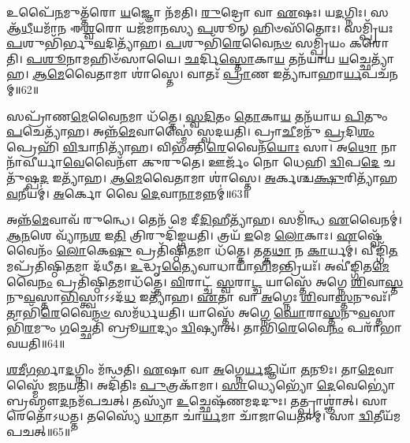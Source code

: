 𑌉𑌪𑍈᳴\-\ul{𑌨}\-𑌮𑍁𑌤𑍍𑌤᳴𑌰𑍋 \ul{𑌯}\-𑌜𑍍𑌞𑍋 𑌨᳴𑌮𑌤𑌿।
\-\ul{𑌰𑍁}\-𑌦𑍍𑌰𑍋 𑌵𑌾 \ul{𑌏}\-𑌷𑌃।
𑌯\-\ul{𑌦}\-𑌗𑍍𑌨𑌿𑌃।
𑌸 𑌆᳴\-\ul{𑌧𑍀}\-𑌯𑌮𑌾᳴𑌨 𑌈\-\ul{𑌶𑍍𑌵}\-𑌰𑍋 𑌯𑌜᳴𑌮𑌾𑌨𑌸𑍍𑌯 \ul{𑌪}\-𑌶𑍂𑌨𑍍 𑌹𑌿𑍞𑌸𑌿᳴𑌤𑍋𑌃।
𑌸𑌮𑍍𑌪𑍍𑌰𑌿᳴𑌯𑌃 \ul{𑌪}\-𑌶𑍁𑌭𑌿᳴𑌰𑍍𑌭𑍁\-\ul{𑌵}\-𑌦𑌿𑌤𑍍𑌯𑌾᳴𑌹।
\-\ul{𑌪}\-𑌶𑍁𑌭𑌿᳴\-\ul{𑌰𑍇}\-𑌵𑍈\-\ul{𑌨}\-\-\ul{𑍞} 𑌸𑌮𑍍𑌪𑍍𑌰𑌿᳴𑌯𑌂 𑌕𑌰𑍋𑌤𑌿।
\-\ul{𑌪}\-\-\ul{𑌶𑍂}\-𑌨𑌾𑌮𑌹𑌿𑍞᳴𑌸𑌾𑌯𑍈।
\-\ul{𑌛}\-𑌰𑍍𑌦𑌿\-\ul{𑌸𑍍𑌤𑍋}\-𑌕𑌾\-\ul{𑌯} 𑌤𑌨᳴𑌯𑌾𑌯 \ul{𑌯}\-𑌚𑍍𑌛𑍇𑌤𑍍𑌯𑌾᳴𑌹।
\-\ul{𑌆}\-\-\-\ul{𑌮𑍇}\-𑌵𑍈𑌤𑌾𑌮𑌾 𑌶𑌾॑𑌸𑍍𑌤𑍇।
𑌵𑌾𑌤𑌃᳴ \ul{𑌪𑍍𑌰𑌾}\-𑌣 𑌇𑌤𑍍𑌯᳴𑌨𑍍𑌵𑌾𑌹𑌾\-\ul{𑌰𑍍𑌯}\-𑌪𑌚᳴𑌨𑌮𑍍॥62॥

𑌸𑌪𑍍𑌰𑌾᳴𑌣\-\ul{𑌮𑍇}\-𑌵𑍈\-\ul{𑌨}\-𑌮𑌾 𑌧᳴𑌤𑍍𑌤𑍇।
\-\ul{𑌸𑍍𑌵}\-\-\ul{𑌦𑌿}\-𑌤𑌂 \ul{𑌤𑍋}\-𑌕𑌾\-\ul{𑌯} 𑌤𑌨᳴𑌯𑌾𑌯 \ul{𑌪𑌿}\-𑌤𑍁𑌂 \ul{𑌪}\-𑌚𑍇𑌤𑍍𑌯𑌾᳴𑌹।
𑌅𑌨𑍍𑌨᳴\-\ul{𑌮𑍇}\-𑌵𑌾𑌸𑍍𑌮𑍈॑ 𑌸𑍍𑌵𑌦𑌯𑌤𑌿।
𑌪𑍍𑌰𑌾\-\ul{𑌚𑍀}\-𑌮𑌨𑍁᳴ \ul{𑌪𑍍𑌰}\-𑌦𑌿\-\ul{𑌶𑌂} 𑌪𑍍𑌰𑍇𑌹𑌿᳴ \ul{𑌵𑌿}\-𑌦𑍍𑌵𑌾𑌨𑌿𑌤𑍍𑌯𑌾᳴𑌹।
𑌵𑌿𑌭᳴𑌕𑍍𑌤𑌿\-\ul{𑌰𑍇}\-𑌵𑍈𑌨᳴\-\ul{𑌯𑍋𑌃} 𑌸𑌾।
𑌅\-\ul{𑌥𑍋} 𑌨𑌾𑌨𑌾᳴𑌵𑍀𑌰𑍍𑌯𑌾\-\ul{𑌵𑍇}\-𑌵𑍈𑌨𑍗᳴ 𑌕𑍁𑌰𑍁𑌤𑍇।
𑌊𑌰𑍍𑌜𑌂᳴ 𑌨𑍋 𑌧𑍇𑌹𑌿 \ul{𑌦𑍍𑌵𑌿}\-𑌪\-\ul{𑌦𑍇} 𑌚𑌤𑍁᳴𑌷𑍍𑌪\-\ul{𑌦} 𑌇𑌤𑍍𑌯𑌾᳴𑌹।
\-\ul{𑌆}\-\-\-\ul{𑌮𑍇}\-𑌵𑍈𑌤𑌾𑌮𑌾 𑌶𑌾॑𑌸𑍍𑌤𑍇।
\-\ul{𑌅}\-𑌰𑍍𑌕𑌶𑍍𑌚\-\ul{𑌕𑍍𑌷𑍁}\-𑌰𑌿𑌤𑍍𑌯𑌾᳴𑌹\-\ul{𑌵}\-𑌨𑍀𑌯𑌮𑍍॑।
\-\ul{𑌅}\-𑌰𑍍𑌕𑍋 𑌵𑍈 \ul{𑌦𑍇}\-𑌵𑌾\-\ul{𑌨𑌾}\-𑌮𑌨𑍍𑌨𑌮𑍍॑॥63॥

𑌅𑌨𑍍𑌨᳴\-\ul{𑌮𑍇}\-𑌵𑌾𑌵᳴ 𑌰𑍁𑌨𑍍𑌧𑍇।
𑌤𑍇𑌨᳴ 𑌮𑍇 𑌦𑍀\-\ul{𑌦𑌿}\-𑌹𑍀𑌤𑍍𑌯𑌾᳴𑌹।
𑌸𑌮𑌿᳴𑌨𑍍𑌧 \ul{𑌏}\-𑌵𑍈𑌨𑌮𑍍॑।
\-\ul{𑌆}\-\-\ul{𑌨}\-𑌶𑍇 𑌵𑍍𑌯𑌾᳴𑌨\-\ul{𑌶} 𑌇\-\ul{𑌤𑌿} 𑌤𑍍𑌰𑌿𑌰𑍁𑌦𑌿᳴𑌙𑍍𑌗𑌯𑌤𑌿।
𑌤𑍍𑌰𑌯᳴ \ul{𑌇}\-𑌮𑍇 \ul{𑌲𑍋}\-𑌕𑌾𑌃।
\-\ul{𑌏}\-𑌷𑍍𑌵𑍇᳴𑌵𑍈𑌨𑌂᳴ \ul{𑌲𑍋}\-𑌕𑍇\-\ul{𑌷𑍁} 𑌪𑍍𑌰𑌤𑌿᳴\-𑌷𑍍𑌠𑌿\-\ul{𑌤}\-𑌮𑌾 𑌧᳴𑌤𑍍𑌤𑍇।
𑌤𑌤𑍍𑌤\-\ul{𑌥𑌾} 𑌨 \ul{𑌕𑌾}\-𑌰𑍍𑌯𑌮𑍍॑।
𑌵𑍀𑌙𑍍𑌗𑌿᳴\-\ul{𑌤}\-𑌮𑌪𑍍𑌰᳴𑌤𑌿𑌷𑍍𑌠𑌿\-\ul{𑌤}\-𑌮𑌾 𑌦᳴𑌧𑍀𑌤।
\-\ul{𑌉}\-𑌦𑍍𑌧𑍃\-\ul{𑌤𑍍𑌯𑍈}\-𑌵𑌾𑌧𑌾𑌯𑌾᳴\-\ul{𑌭𑌿}\-𑌮𑌨𑍍𑌤𑍍𑌰𑌿𑌯𑌃᳴।
𑌅𑌵𑍀॑𑌙𑍍𑌗𑌿𑌤\-\ul{𑌮𑍇}\-𑌵𑍈\-\ul{𑌨𑌂} 𑌪𑍍𑌰𑌤𑌿᳴\-𑌷𑍍𑌠𑌿\-\ul{𑌤}\-𑌮𑌾𑌧᳴𑌤𑍍𑌤𑍇।
\-\ul{𑌵𑌿}\-𑌰𑌾𑌟𑍍𑌚᳴ \ul{𑌸𑍍𑌵}\-𑌰𑌾\-\ul{𑌟𑍍𑌚} 𑌯𑌾𑌸𑍍𑌤𑍇᳴ 𑌅𑌗𑍍𑌨𑍇 \ul{𑌶𑌿}\-𑌵𑌾\-\ul{𑌸𑍍𑌤}\-𑌨𑍁\-\ul{𑌵}\-𑌸𑍍𑌤𑌾\-\ul{𑌭𑌿}\-𑌸𑍍𑌤𑍍𑌵𑌾\-𑌽𑌽𑌦᳴\-\ul{𑌧} 𑌇𑌤𑍍𑌯𑌾᳴𑌹।
\-\ul{𑌏}\-𑌤𑌾 𑌵𑌾 \ul{𑌅}\-𑌗𑍍𑌨𑍇𑌃 \ul{𑌶𑌿}\-𑌵𑌾\-\ul{𑌸𑍍𑌤}\-𑌨𑍁𑌵𑌃᳴।
𑌤𑌾𑌭𑌿᳴\-\ul{𑌰𑍇}\-𑌵𑍈\-\ul{𑌨}\-\-\ul{𑍞} 𑌸𑌮᳴𑌰𑍍𑌧𑌯𑌤𑌿।
𑌯𑌾𑌸𑍍𑌤𑍇᳴ 𑌅𑌗𑍍𑌨𑍇 \ul{𑌘𑍋}\-𑌰𑌾\-\ul{𑌸𑍍𑌤}\-𑌨𑍁\-\ul{𑌵}\-𑌸𑍍𑌤𑌾𑌭𑌿᳴\-\ul{𑌰}\-𑌮𑍁𑌂 \ul{𑌗}\-𑌚𑍍𑌛𑍇𑌤𑌿᳴ 𑌬𑍍𑌰𑍂\-\ul{𑌯𑌾}\-𑌦𑍍𑌯𑌂 \ul{𑌦𑍍𑌵𑌿}\-𑌷𑍍𑌯𑌾𑌤𑍍।
𑌤𑌾𑌭𑌿᳴\-\ul{𑌰𑍇}\-𑌵𑍈\-\ul{𑌨𑌂} 𑌪𑌰𑌾᳴𑌭𑌾𑌵𑌯𑌤𑌿॥64॥\anuvakamend[\-\ul{𑌲𑍋}\-𑌕𑍋᳴\-𑌽\-𑌸𑍃𑌜𑌤𑍈\-\ul{𑌨}\-𑌮𑌾𑌧᳴𑌤𑍍𑌤𑍇\-𑌽𑌨𑍍𑌵𑌾𑌹𑌾\-\ul{𑌰𑍍𑌯}\-𑌪𑌚᳴𑌨𑌂 \ul{𑌦𑍇}\-𑌵𑌾\-\ul{𑌨𑌾}\-𑌮𑌨𑍍𑌨᳴𑌮𑍇\-\ul{𑌨𑌂} 𑌪𑍍𑌰𑌤𑌿᳴\-𑌷𑍍𑌠𑌿\-\ul{𑌤}\-𑌮𑌾𑌧᳴\-\ul{𑌤𑍍𑌤𑍇} 𑌪𑌞𑍍𑌚᳴ 𑌚]

\-\ul{𑌶}\-\-\ul{𑌮𑍀}\-\-\ul{𑌗}\-𑌰𑍍𑌭𑌾\-\ul{𑌦}\-𑌗𑍍𑌨𑌿𑌂 𑌮᳴𑌨𑍍𑌥𑌤𑌿।
\-\ul{𑌏}\-𑌷𑌾 𑌵𑌾 \ul{𑌅}\-𑌗𑍍𑌨𑍇\-\ul{𑌰𑍍𑌯}\-𑌜𑍍𑌞𑌿𑌯𑌾᳴ \ul{𑌤}\-𑌨𑍂𑌃।
𑌤𑌾\-\ul{𑌮𑍇}\-𑌵𑌾𑌸𑍍𑌮𑍈᳴ 𑌜𑌨𑌯𑌤𑌿।
𑌅𑌦𑌿᳴𑌤𑌿𑌃 \ul{𑌪𑍁}\-𑌤𑍍𑌰𑌕𑌾᳴𑌮𑌾।
\-\ul{𑌸𑌾}\-𑌧𑍍𑌯𑍇𑌭𑍍𑌯𑍋᳴ \ul{𑌦𑍇}\-𑌵𑍇𑌭𑍍𑌯𑍋॑ 𑌬𑍍𑌰𑌹𑍍𑌮𑍗\-\ul{𑌦}\-𑌨𑌮᳴𑌪𑌚𑌤𑍍।
𑌤𑌸𑍍𑌯𑌾᳴ \ul{𑌉}\-𑌚𑍍𑌛𑍇𑌷᳴𑌣𑌮𑌦𑌦𑍁𑌃।
𑌤𑌤𑍍𑌪𑍍𑌰𑌾𑌶𑍍𑌞𑌾॑𑌤𑍍।
𑌸𑌾 𑌰𑍇𑌤𑍋᳴\-𑌽𑌧𑌤𑍍𑌤।
𑌤𑌸𑍍𑌯𑍈᳴ \ul{𑌧𑌾}\-𑌤𑌾 𑌚𑌾॑\-\ul{𑌰𑍍𑌯}\-𑌮𑌾 𑌚𑌾᳴𑌜𑌾𑌯𑍇𑌤𑌾𑌮𑍍।
𑌸𑌾 \ul{𑌦𑍍𑌵𑌿}\-𑌤𑍀𑌯᳴𑌮𑌪𑌚𑌤𑍍॥65॥

